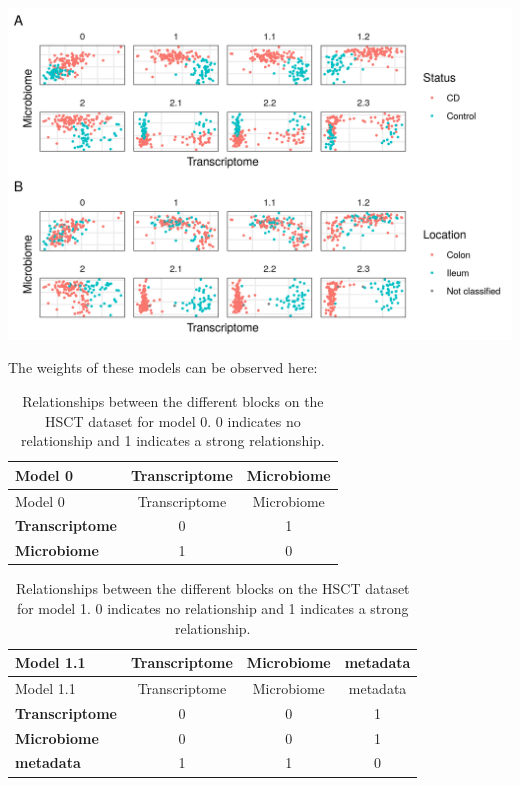 \documentclass[
  a4paper,
]{book}
\let\origfigure\figure
\let\endorigfigure\endfigure
\renewenvironment{figure}[1][2] {
    \expandafter\origfigure\expandafter[!ht]
} {
    \endorigfigure
}
\begin{document}
\begin{figure}
\centering
\includegraphics{images/hsct-models.png}
\caption{\label{fig:hsct-models} On the abscissa the transcriptome, on the ordinate the Microbiome. Each square represents a different model of the HSCT dataset. On panel A colored by disease status, on panel B colored by sample location. Model 0 has only transcriptome and microbiome data, models 1 to 1.2 with data about the samples and models 2.1 to 2.3 with data about the samples split in 3 blocks.}
\end{figure}

The weights of these models can be observed here:

\begin{longtable}[]{@{}lcc@{}}
\caption{\label{tab:hsct-model0} Relationships between the different blocks on the HSCT dataset for model 0. 0 indicates no relationship and 1 indicates a strong relationship.}\tabularnewline
\toprule
Model 0 & Transcriptome & Microbiome \\
\midrule
\endfirsthead
\toprule
Model 0 & Transcriptome & Microbiome \\
\midrule
\endhead
\textbf{Transcriptome} & 0 & 1 \\
\textbf{Microbiome} & 1 & 0 \\
\bottomrule
\end{longtable}

\begin{longtable}[]{@{}lccc@{}}
\caption{\label{tab:hsct-model1-1} Relationships between the different blocks on the HSCT dataset for model 1. 0 indicates no relationship and 1 indicates a strong relationship.}\tabularnewline
\toprule
Model 1.1 & Transcriptome & Microbiome & metadata \\
\midrule
\endfirsthead
\toprule
Model 1.1 & Transcriptome & Microbiome & metadata \\
\midrule
\endhead
\textbf{Transcriptome} & 0 & 0 & 1 \\
\textbf{Microbiome} & 0 & 0 & 1 \\
\textbf{metadata} & 1 & 1 & 0 \\
\bottomrule
\end{longtable}
\end{document}
